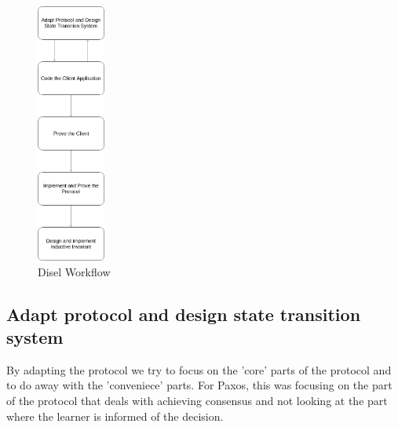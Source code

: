 \begin{figure}
\centering
\includegraphics[width=0.2\textwidth]{figures/disel_workflow.png}
\caption{Disel Workflow
\label{fig:myInlineFigure}}
\end{figure}

%
%
%
%
%
%
%
%
%

\subsection{Adapt protocol and design state transition system}
By adapting the protocol we try to focus on the 'core' parts of the protocol
and to do away with the 'conveniece' parts. For Paxos, this was focusing on the
part of the protocol that deals with achieving consensus and not looking at the
part where the learner is informed of the decision.

